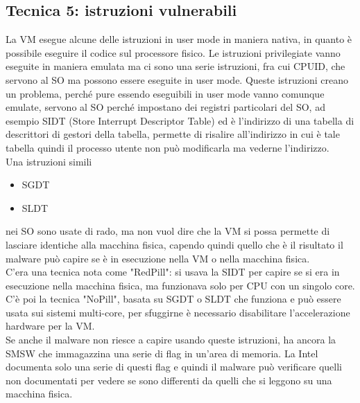 \documentclass[12pt, oneside]{extbook}
\begin{document}
\subsection{Tecnica 5: istruzioni vulnerabili}
La VM esegue alcune delle istruzioni in user mode in maniera nativa, in quanto è possibile eseguire il codice sul processore fisico. Le istruzioni privilegiate vanno eseguite in maniera emulata ma ci sono una serie istruzioni, fra cui CPUID, che servono al SO ma possono essere eseguite in user mode. Queste istruzioni creano un problema, perché pure essendo eseguibili in user mode vanno comunque emulate, servono al SO perché impostano dei registri particolari del SO, ad esempio SIDT (Store Interrupt Descriptor Table) ed è l'indirizzo di una tabella di descrittori di gestori della tabella, permette di risalire all'indirizzo in cui è tale tabella quindi il processo utente non può modificarla ma vederne l'indirizzo.\\Una istruzioni simili
\begin{itemize}
\item SGDT
\item SLDT
\end{itemize}
nei SO sono usate di rado, ma non vuol dire che la VM si possa permette di lasciare identiche alla macchina fisica, capendo quindi quello che è il risultato il malware può capire se è in esecuzione nella VM o nella macchina fisica.\\C'era una tecnica nota come "RedPill": si usava la SIDT per capire se si era in esecuzione nella macchina fisica, ma funzionava solo per CPU con un singolo core.\\C'è poi la tecnica "NoPill", basata su SGDT o SLDT che funziona e può essere usata sui sistemi multi-core, per sfuggirne è necessario disabilitare l'accelerazione hardware per la VM.\\Se anche il malware non riesce a capire usando queste istruzioni, ha ancora la SMSW che immagazzina una serie di flag in un'area di memoria. La Intel documenta solo una serie di questi flag e quindi il malware può verificare quelli non documentati per vedere se sono differenti da quelli che si leggono su una macchina fisica.
\end{document}
